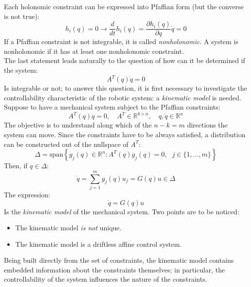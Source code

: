 Each holonomic constraint can be expressed into Pfaffian form (but the converse is not true):
\begin{equation*}
    h_i(q)=0 \rightarrow \frac{d}{dt}h_i(q)=\frac{\partial h_i(q)}{\partial q} \dot{q}=0
\end{equation*}
If a Pfaffian constraint is not integrable, it is called \textit{nonholonomic}. A system is nonholonomic if it has at least one nonholonomic constraint.\\
The last statement leads naturally to the question of how can it be determined if the system:
\[A^T(q)\dot{q}=0\]
Is integrable or not; to answer this question, it is first necessary to investigate the controllability characteristic of the robotic system: a \textit{kinematic model} is needed. \\
Suppose to have a mechanical system subject to the Pfaffian constraints:
\begin{equation*}
    A^T(q)\dot{q}=0, \quad A^T \in \mathbb{R}^{k\times n}, \quad q,\dot{q} \in \mathbb{R}^n
\end{equation*}
The objective is to understand along which of the $n-k=m$ directions the system can move. Since the constraints have to be always satisfied, a distribution can be constructed out of the nullspace of $A^T$:
\begin{equation*}
    \Delta = \text{span}\left\{g_j(q)\in \mathbb{R}^{n}: A^T(q)g_j(q)=0, \textbf{ } j \in \{1,\dots,m\}\right\}
\end{equation*}
Then, if $q \in \Delta$:
\begin{equation*}
    \dot{q}=\sum_{j=1}^{m}g_j(q)u_j=G(q)u \in \Delta
\end{equation*}
The expression:
\begin{equation}\label{kin_model}
    \dot{q}=G(q)u
\end{equation}
Is the \textit{kinematic model} of the mechanical system. Two points are to be noticed:
\begin{itemize}
    \item The kinematic model \textit{is not} unique. 
    \item The kinematic model is a driftless affine control system.
\end{itemize}
Being built directly from the set of constraints, the kinematic model contains embedded information about the constraints themselves; in particular, the controllability of the system influences the nature of the constraints.
